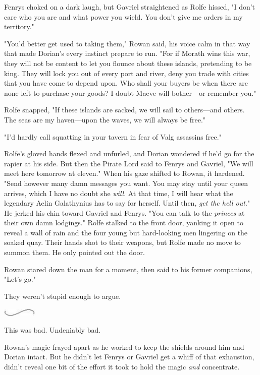 Fenrys choked on a dark laugh, but Gavriel straightened as Rolfe hissed, "I don't care who you are and what power you wield. You don't give me orders in my territory."

"You'd better get used to taking them," Rowan said, his voice calm in that way that made Dorian's every instinct prepare to run. "For if Morath wins this war, they will not be content to let you flounce about these islands, pretending to be king. They will lock you out of every port and river, deny you trade with cities that you have come to depend upon. Who shall your buyers be when there are none left to purchase your goods? I doubt Maeve will bother---or remember you."

Rolfe snapped, "If these islands are sacked, we will sail to others---and others. The seas are my haven---upon the waves, we will always be free."

"I'd hardly call squatting in your tavern in fear of Valg assassins free."

Rolfe's gloved hands flexed and unfurled, and Dorian wondered if he'd go for the rapier at his side. But then the Pirate Lord said to Fenrys and Gavriel, "We will meet here tomorrow at eleven." When his gaze shifted to Rowan, it hardened. "Send however many damn messages you want. You may stay until your queen arrives, which I have no doubt she
\emph{will}. At that time, I will hear what the legendary Aelin Galathynius has to say for herself. Until then, \emph{get the hell out}." He jerked his chin toward Gavriel and Fenrys. "You can talk to the \emph{princes} at their own damn lodgings." Rolfe stalked to the front door, yanking it open to reveal a wall of rain and the four young but hard-looking men lingering on the soaked quay. Their hands shot to their weapons, but Rolfe made no move to summon them. He only pointed out the door.

Rowan stared down the man for a moment, then said to his former companions, "Let's go."

They weren't stupid enough to argue.

\includegraphics[width=0.65in,height=0.13in]{images/seperator}

This was bad. Undeniably bad.

Rowan's magic frayed apart as he worked to keep the shields around him and Dorian intact. But he didn't let Fenrys or Gavriel get a whiff of that exhaustion, didn't reveal one bit of the effort it took to hold the magic \emph{and} concentrate.

